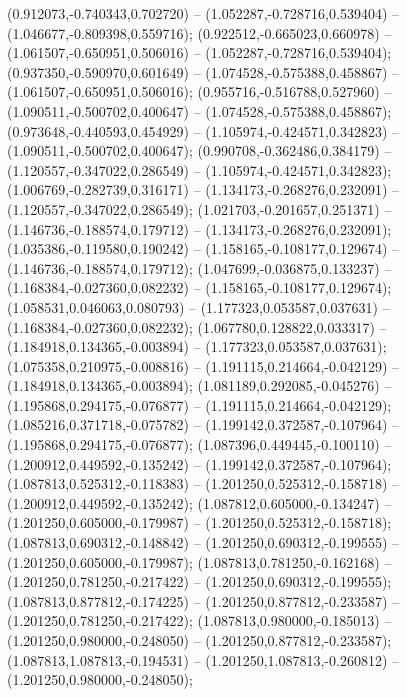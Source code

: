  (0.912073,-0.740343,0.702720) -- (1.052287,-0.728716,0.539404) -- (1.046677,-0.809398,0.559716);
 (0.922512,-0.665023,0.660978) -- (1.061507,-0.650951,0.506016) -- (1.052287,-0.728716,0.539404);
 (0.937350,-0.590970,0.601649) -- (1.074528,-0.575388,0.458867) -- (1.061507,-0.650951,0.506016);
 (0.955716,-0.516788,0.527960) -- (1.090511,-0.500702,0.400647) -- (1.074528,-0.575388,0.458867);
 (0.973648,-0.440593,0.454929) -- (1.105974,-0.424571,0.342823) -- (1.090511,-0.500702,0.400647);
 (0.990708,-0.362486,0.384179) -- (1.120557,-0.347022,0.286549) -- (1.105974,-0.424571,0.342823);
 (1.006769,-0.282739,0.316171) -- (1.134173,-0.268276,0.232091) -- (1.120557,-0.347022,0.286549);
 (1.021703,-0.201657,0.251371) -- (1.146736,-0.188574,0.179712) -- (1.134173,-0.268276,0.232091);
 (1.035386,-0.119580,0.190242) -- (1.158165,-0.108177,0.129674) -- (1.146736,-0.188574,0.179712);
 (1.047699,-0.036875,0.133237) -- (1.168384,-0.027360,0.082232) -- (1.158165,-0.108177,0.129674);
 (1.058531,0.046063,0.080793) -- (1.177323,0.053587,0.037631) -- (1.168384,-0.027360,0.082232);
 (1.067780,0.128822,0.033317) -- (1.184918,0.134365,-0.003894) -- (1.177323,0.053587,0.037631);
 (1.075358,0.210975,-0.008816) -- (1.191115,0.214664,-0.042129) -- (1.184918,0.134365,-0.003894);
 (1.081189,0.292085,-0.045276) -- (1.195868,0.294175,-0.076877) -- (1.191115,0.214664,-0.042129);
 (1.085216,0.371718,-0.075782) -- (1.199142,0.372587,-0.107964) -- (1.195868,0.294175,-0.076877);
 (1.087396,0.449445,-0.100110) -- (1.200912,0.449592,-0.135242) -- (1.199142,0.372587,-0.107964);
 (1.087813,0.525312,-0.118383) -- (1.201250,0.525312,-0.158718) -- (1.200912,0.449592,-0.135242);
 (1.087812,0.605000,-0.134247) -- (1.201250,0.605000,-0.179987) -- (1.201250,0.525312,-0.158718);
 (1.087813,0.690312,-0.148842) -- (1.201250,0.690312,-0.199555) -- (1.201250,0.605000,-0.179987);
 (1.087813,0.781250,-0.162168) -- (1.201250,0.781250,-0.217422) -- (1.201250,0.690312,-0.199555);
 (1.087813,0.877812,-0.174225) -- (1.201250,0.877812,-0.233587) -- (1.201250,0.781250,-0.217422);
 (1.087813,0.980000,-0.185013) -- (1.201250,0.980000,-0.248050) -- (1.201250,0.877812,-0.233587);
 (1.087813,1.087813,-0.194531) -- (1.201250,1.087813,-0.260812) -- (1.201250,0.980000,-0.248050);
